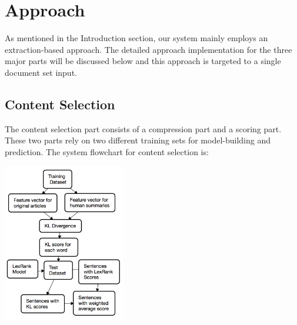 \documentclass[11pt]{article}
\begin{document}
\section{Approach}

As mentioned in the Introduction section, our system mainly employs an extraction-based approach. The detailed approach implementation for the three major parts will be discussed below and this approach is targeted to a single document set input.

\subsection{Content Selection}
The content selection part consists of a compression part and a scoring part. These two parts rely on two different training sets for model-building and prediction. The system flowchart for content selection is:
\begin{center}
\includegraphics[width=0.4\textwidth]{cs_flow.png}
\end{center}
\end{document}
